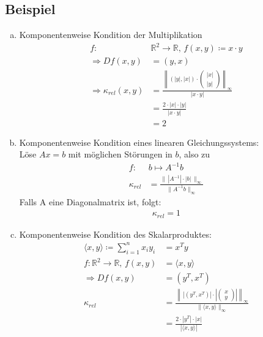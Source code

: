 \documentclass[ngerman,fontsize=11pt, paper=a4, parskip=half, titlepage=true, toc=bib]{scrbook}
\newcommand{\R}{\mathds{R}}
\begin{document}
  \subsection{Beispiel}
  \begin{enumerate}[a)]
  \item Komponentenweise Kondition der Multiplikation
    \begin{align*}
      f:&\R^2 \rightarrow \R, \, f(x,y) \coloneqq x\cdot y \\
      \Rightarrow Df(x,y) &= (y, x)  \\
      \Rightarrow \kappa_{rel}(x,y) &= \frac{\left\| (|y|, |x|)\cdot \begin{pmatrix}
            |x| \\
            |y|
          \end{pmatrix}\right\|_\infty}
      {|x\cdot y|} \\
        &= \frac{2\cdot|x|\cdot |y|}{|x\cdot y|} \\
        &= 2
    \end{align*}
  \item Komponentenweise Kondition eines linearen Gleichungssystems:\\
    Löse $Ax=b$ mit möglichen Störungen in $b$, also zu
    \begin{align*}
      f: & b\mapsto A^{-1}b \\
      \kappa_{rel} & = \frac{\| \, |A^{-1}| \cdot |b|\, \|_\infty}{\|A^{-1}b\|_\infty}
    \end{align*}
    Falls A eine Diagonalmatrix ist, folgt:
    \begin{gather*}
      \kappa_{rel}=1
    \end{gather*}
  \item Komponentenweise Kondition des Skalarproduktes:
    \begin{align*}
      \langle x,y \rangle \coloneqq \sum_{i=1}^{n}x_i y_i& = x^Ty \\
      f: \R^2 \rightarrow \R, \, f(x,y) &= \langle x,y \rangle \\
      \Rightarrow Df(x,y) &= (y^T, x^T) \\
      \kappa_{rel}  &= \frac{\left\| \,\left|(y^T, x^T)\right|\cdot\left|\begin{pmatrix}
              x \\
              y
            \end{pmatrix}\right|\right\|_\infty }
      {\|\langle x,y\rangle\|_\infty}\\
                                                         &= \frac{2\cdot |y^T|\cdot |x|}{|\langle x,y\rangle|} \\

\end{align*}
\end{enumerate}
\end{document}
